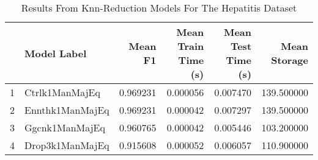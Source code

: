 \begin{table}
\centering
\caption{Results From Knn-Reduction Models For The Hepatitis Dataset}
\label{tab:knn_reduction_results_hepatitis}
\begin{tabular}{rlrrrr}
\toprule
 & Model Label & Mean F1 & Mean Train Time (s) & Mean Test Time (s) & Mean Storage \\
\midrule
1 & Ctrlk1ManMajEq & 0.969231 & 0.000056 & 0.007470 & 139.500000 \\
2 & Ennthk1ManMajEq & 0.969231 & 0.000042 & 0.007297 & 139.500000 \\
3 & Ggcnk1ManMajEq & 0.960765 & 0.000042 & 0.005446 & 103.200000 \\
4 & Drop3k1ManMajEq & 0.915608 & 0.000052 & 0.006057 & 110.900000 \\
\bottomrule
\end{tabular}
\end{table}
